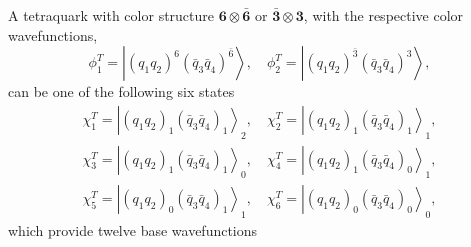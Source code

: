 \documentclass[prt,twocolumn,floatfix,nofootinbib]{revtex4}
\begin{document}
A tetraquark with color structure $\boldsymbol{6}\otimes\boldsymbol{\bar{6}}$ or $\boldsymbol{\bar{3}}\otimes\boldsymbol{3}$, with the respective color wavefunctions,
\begin{equation}\label{colorT}
    \phi_{1}^{T}=\left| {\left(q_{1}q_{2}\right)}^{6} {\left(\bar{q}_{3}\bar{q}_{4}\right)}^{\bar{6}} \right\rangle, \quad
    \phi_{2}^{T}=\left| {\left(q_{1}q_{2}\right)}^{\bar{3}} {\left(\bar{q}_{3}\bar{q}_{4}\right)}^{3} \right\rangle,
\end{equation}
can be one of the following six states
\begin{equation}\label{spinT}
    \begin{aligned}
        \chi_{1}^{T}={\left| {\left(q_{1}q_{2}\right)}_{1} {\left(\bar{q}_{3}\bar{q}_{4}\right)}_{1} \right\rangle}_{2}, \quad
        \chi_{2}^{T}={\left| {\left(q_{1}q_{2}\right)}_{1} {\left(\bar{q}_{3}\bar{q}_{4}\right)}_{1} \right\rangle}_{1}, \\
        \chi_{3}^{T}={\left| {\left(q_{1}q_{2}\right)}_{1} {\left(\bar{q}_{3}\bar{q}_{4}\right)}_{1} \right\rangle}_{0}, \quad
        \chi_{4}^{T}={\left| {\left(q_{1}q_{2}\right)}_{1} {\left(\bar{q}_{3}\bar{q}_{4}\right)}_{0} \right\rangle}_{1}, \\
        \chi_{5}^{T}={\left| {\left(q_{1}q_{2}\right)}_{0} {\left(\bar{q}_{3}\bar{q}_{4}\right)}_{1} \right\rangle}_{1}, \quad
        \chi_{6}^{T}={\left| {\left(q_{1}q_{2}\right)}_{0} {\left(\bar{q}_{3}\bar{q}_{4}\right)}_{0} \right\rangle}_{0},
    \end{aligned}
\end{equation}
which provide twelve base wavefunctions
\end{document}

